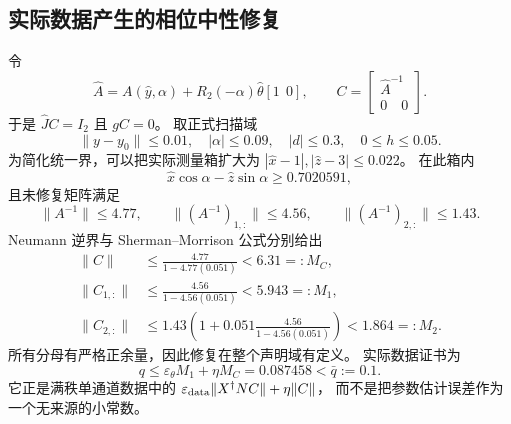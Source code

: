 \documentclass[11pt,a4paper]{article}
\numberwithin{equation}{section}
\theoremstyle{definition}
\begin{document}
\subsection{实际数据产生的相位中性修复}
令
\begin{equation}
 \widehat A=A(\widehat y,\alpha)
        +R_2(-\alpha)\widehat\theta[1\ \ 0],\qquad
 C=\begin{bmatrix}\widehat A^{-1}\\0\quad0\end{bmatrix}.
 \label{v44:eq:repaired-neutral-allocation}
\end{equation}
于是 $\widehat JC=I_2$ 且 $gC=0$。
取正式扫描域
\begin{equation}
 \|y-y_0\|\le0.01,\quad |\alpha|\le0.09,\quad |d|\le0.3,
 \quad 0\le h\le0.05.
 \label{v44:eq:new-scan-domain}
\end{equation}
为简化统一界，可以把实际测量箱扩大为
$|\widehat x-1|,|\widehat z-3|\le0.022$。
在此箱内
\begin{equation}
 \widehat x\cos\alpha-\widehat z\sin\alpha\ge0.7020591,
\end{equation}
且未修复矩阵满足
\begin{equation}
 \|A^{-1}\|\le4.77,\qquad
 \|(A^{-1})_{1,:}\|\le4.56,\qquad
 \|(A^{-1})_{2,:}\|\le1.43.
\end{equation}
Neumann 逆界与 Sherman--Morrison 公式分别给出
\begin{align}
 \|C\|&\le\frac{4.77}{1-4.77(0.051)}<6.31=:M_C,\\
 \|C_{1,:}\|&\le\frac{4.56}{1-4.56(0.051)}<5.943=:M_1,\\
 \|C_{2,:}\|&\le1.43\left(1+0.051\frac{4.56}{1-4.56(0.051)}\right)
                      <1.864=:M_2.
 \label{v44:eq:new-inverse-bounds}
\end{align}
所有分母有严格正余量，因此修复在整个声明域有定义。
实际数据证书为
\begin{equation}
 q\le\varepsilon_\theta M_1+\eta M_C
   =0.087458<\bar q:=0.1.
 \label{v44:eq:new-q-certificate}
\end{equation}
它正是满秩单通道数据中的
$\varepsilon_{\rm data}\|X^\dagger NC\|+\eta\|C\|$，
而不是把参数估计误差作为一个无来源的小常数。
\end{document}
